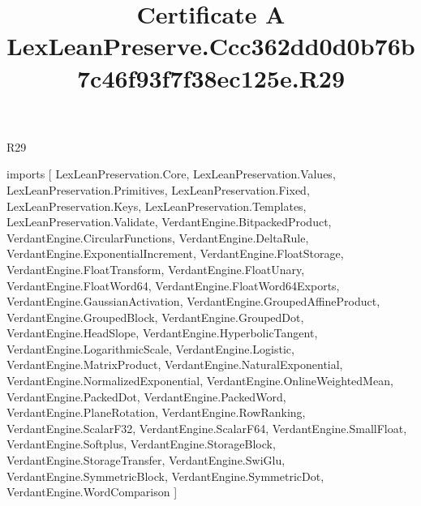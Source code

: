 \begin{lexlean}{R29}
\title{Certificate A LexLeanPreserve.Ccc362dd0d0b76b7c46f93f7f38ec125e.R29}
\begin{coremodule}
imports [
  LexLeanPreservation.Core,
  LexLeanPreservation.Values,
  LexLeanPreservation.Primitives,
  LexLeanPreservation.Fixed,
  LexLeanPreservation.Keys,
  LexLeanPreservation.Templates,
  LexLeanPreservation.Validate,
  VerdantEngine.BitpackedProduct,
  VerdantEngine.CircularFunctions,
  VerdantEngine.DeltaRule,
  VerdantEngine.ExponentialIncrement,
  VerdantEngine.FloatStorage,
  VerdantEngine.FloatTransform,
  VerdantEngine.FloatUnary,
  VerdantEngine.FloatWord64,
  VerdantEngine.FloatWord64Exports,
  VerdantEngine.GaussianActivation,
  VerdantEngine.GroupedAffineProduct,
  VerdantEngine.GroupedBlock,
  VerdantEngine.GroupedDot,
  VerdantEngine.HeadSlope,
  VerdantEngine.HyperbolicTangent,
  VerdantEngine.LogarithmicScale,
  VerdantEngine.Logistic,
  VerdantEngine.MatrixProduct,
  VerdantEngine.NaturalExponential,
  VerdantEngine.NormalizedExponential,
  VerdantEngine.OnlineWeightedMean,
  VerdantEngine.PackedDot,
  VerdantEngine.PackedWord,
  VerdantEngine.PlaneRotation,
  VerdantEngine.RowRanking,
  VerdantEngine.ScalarF32,
  VerdantEngine.ScalarF64,
  VerdantEngine.SmallFloat,
  VerdantEngine.Softplus,
  VerdantEngine.StorageBlock,
  VerdantEngine.StorageTransfer,
  VerdantEngine.SwiGlu,
  VerdantEngine.SymmetricBlock,
  VerdantEngine.SymmetricDot,
  VerdantEngine.WordComparison
]


\end{coremodule}
\end{lexlean}
